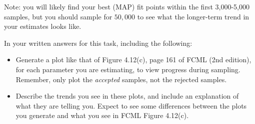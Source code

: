 \documentclass[10pt]{article}
\begin{document}
\begin{enumerate}
Note: you will likely find your best (MAP) fit points within the first 3,000-5,000 samples, but you should sample for $50,000$ to see what the longer-term trend in your estimates looks like.

In your written answers for this task, including the following: 
\begin{itemize}
\item Generate a plot like that of Figure 4.12(c), page 161 of FCML (2nd edition), for each parameter you are estimating, to view progress during sampling.  Remember, only plot the {\em accepted} samples, not the rejected samples.


\item Describe the trends you see in these plots, and include an explanation of what they are telling you.  Expect to see some differences between the plots you generate and what you see in FCML Figure 4.12(c).


\end{itemize}


\end{enumerate}
\end{document}
